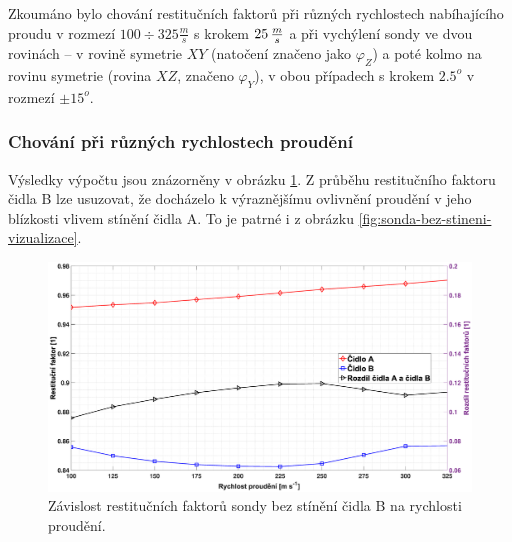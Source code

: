         Zkoumáno bylo chování restitučních faktorů při různých rychlostech nabíhajícího proudu v rozmezí $100 \div 325 \unit{\frac{m}{s}}$ s krokem $25 \, \frac{m}{s}$ a při vychýlení sondy ve dvou rovinách – v rovině symetrie $XY$ (natočení značeno jako $\varphi _Z$) a poté kolmo na rovinu symetrie (rovina $XZ$, značeno $\varphi _Y$), v obou případech s krokem $2.5^o$ v rozmezí $\pm 15^o$.
        
        \newpage
        \subsubsection{Chování při různých rychlostech proudění}
            Výsledky výpočtu jsou znázorněny v obrázku \ref{fig:sonda-bez-stineni-rychlosti}. Z průběhu restitučního faktoru čidla B lze usuzovat, že docházelo k výraznějšímu ovlivnění proudění v jeho blízkosti vlivem stínění čidla A. To je patrné i z obrázku \ref{fig:sonda-bez-stineni-vizualizace}. 
            
            \begin{figure}[ht!]
                \centering
                \includegraphics*[width=\textwidth, trim={5.9cm 1.0cm 2.7cm 2.0cm}]{400_SIMULACE_KONSTRUKCNICH_UPRAV/Grafy/01_rychlosti.eps}
                \caption{Závislost restitučních faktorů sondy bez stínění čidla B na rychlosti proudění.}
                \label{fig:sonda-bez-stineni-rychlosti}
            \end{figure}

